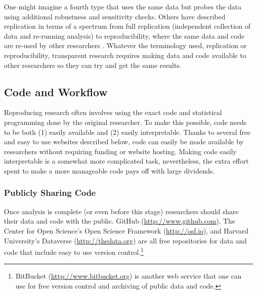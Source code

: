 \documentclass[12pt] {article}
\begin{document}
One might imagine a fourth type that uses the same data but probes the data using additional robustness and sensitivity checks. Others have described replication in terms of a spectrum from full replication (independent collection of data and re-running analysis) to
reproducibility, where the same data and code are re-used by other
researchers \citep{peng_reproducible_2011}. Whatever the terminology used, replication or reproducibility, transparent research requires making data and code available to other researchers so they can try and get the same results.


\subsection{Code and Workflow}\label{code-and-workflow}

Reproducing research often involves using the exact code and statistical
programming done by the original researcher. To make this possible, code
needs to be both (1) easily available and (2) easily interpretable.
Thanks to several free and easy to use websites described below, code
can easily be made available by researchers without requiring funding or
website hosting. Making code easily interpretable is a somewhat more complicated
task, nevertheless, the extra effort spent to make a more manageable
code pays off with large dividends.

\subsubsection{Publicly Sharing Code}\label{publicly-sharing-code}

Once analysis is complete (or even before this stage) researchers should
share their data and code with the public. GitHub
(\url{http://www.github.com}), The Center for Open Science's Open
Science Framework (\url{http://osf.io}), and Harvard University's
Dataverse (\url{http://thedata.org}) are all free repositories for data
and code that include easy to use version control.\footnote{BitBucket
  (\href{styles.xml}{http://www.bitbucket.org}) is another
  web service that one can use for free version control and archiving
  of public data and code.} 
  
\end{document}
